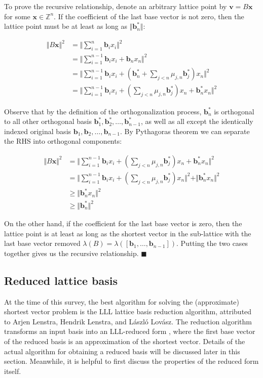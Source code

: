 To prove the recursive relationship, denote an arbitrary lattice point by $\mathbf{v} = B\mathbf{x}$ for some $\mathbf{x} \in \mathbb{Z}^n$. If the coefficient of the last base vector is not zero, then the lattice point must be at least as long as $\Vert \mathbf{b}_n^\ast \Vert$:

$$
\begin{aligned}
\Vert B\mathbf{x} \Vert^2 &= \Vert \sum_{i=1}^n\mathbf{b}_i x_i \Vert^2 \\
&= \Vert \sum_{i=1}^{n-1}\mathbf{b}_ix_i + \mathbf{b}_nx_n \Vert^2 \\
&= \Vert \sum_{i=1}^{n-1}\mathbf{b}_ix_i + (\mathbf{b}_n^* + \sum_{j<n}\mu_{j, n}\mathbf{b}_j^\ast)x_n \Vert^2 \\
&= \Vert \sum_{i=1}^{n-1}\mathbf{b}_ix_i + (\sum_{j<n}\mu_{j, n}\mathbf{b}_j^\ast) x_n  + \mathbf{b}_n^\ast x_n\Vert^2
\end{aligned}
$$

Observe that by the definition of the orthogonalization process, $\mathbf{b}_n^\ast$ is orthogonal to all other orthogonal basis $\mathbf{b}_1^\ast, \mathbf{b}_2^\ast, \ldots, \mathbf{b}_{n-1}^\ast$, as well as all except the identically indexed original basis $\mathbf{b}_1, \mathbf{b}_2, \ldots, \mathbf{b}_{n-1}$. By Pythagoras theorem we can separate the RHS into orthogonal components:

$$
\begin{aligned}
\Vert B\mathbf{x} \Vert^2 
&= \Vert \sum_{i=1}^{n-1}\mathbf{b}_ix_i + (\sum_{j<n}\mu_{j, n}\mathbf{b}_j^\ast) x_n  + \mathbf{b}_n^\ast x_n\Vert^2 \\
&= \Vert \sum_{i=1}^{n-1}\mathbf{b}_ix_i + (\sum_{j<n}\mu_{j, n}\mathbf{b}_j^\ast) x_n \Vert^2 + \Vert \mathbf{b}_n^\ast x_n \Vert^2 \\
&\geq \Vert \mathbf{b}_n^\ast x_n \Vert^2 \\
&\geq \Vert \mathbf{b}_n^\ast \Vert^2
\end{aligned}
$$

On the other hand, if the coefficient for the last base vector is zero, then the lattice point is at least as long as the shortest vector in the sub-lattice with the last base vector removed $\lambda(B) = \lambda([\mathbf{b}_1, \ldots, \mathbf{b}_{n-1}])$. Putting the two cases together gives us the recursive relationship. $\blacksquare$

\subsection{Reduced lattice basis}
At the time of this survey, the best algorithm for solving the (approximate) shortest vector problem is the LLL lattice basis reduction algorithm, attributed to Arjen Lenstra, Hendrik Lenstra, and László Lovász. The reduction algorithm transforms an input basis into an LLL-reduced form \cite{lenstra1982factoring}, where the first base vector of the reduced basis is an approximation of the shortest vector. Details of the actual algorithm for obtaining a reduced basis will be discussed later in this section. Meanwhile, it is helpful to first discuss the properties of the reduced form itself.

